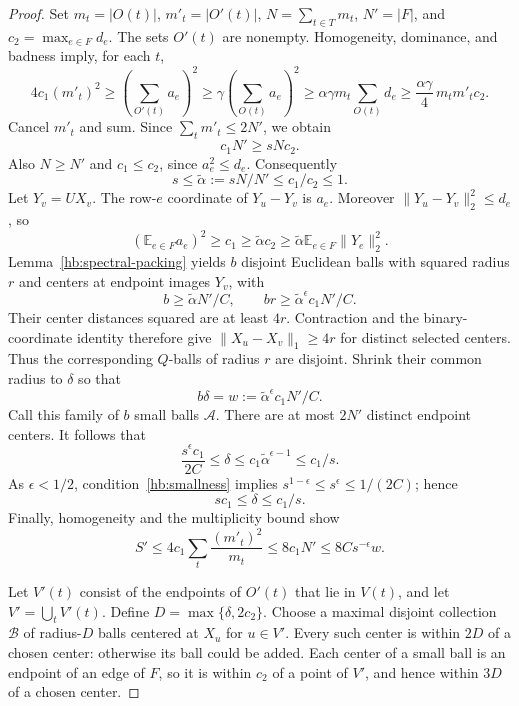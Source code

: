\documentclass[11pt]{amsart}
\theoremstyle{definition}
\theoremstyle{remark}
\numberwithin{equation}{section}
\begin{document}
\begin{proof}
Set $m_t=|O(t)|$, $m'_t=|O'(t)|$,
$N=\sum_{t\in T}m_t$, $N'=|F|$, and $c_2=\max_{e\in F}d_e$.
The sets $O'(t)$ are nonempty.  Homogeneity, dominance, and badness
imply, for each $t$,
\[
 4c_1(m'_t)^2
 \ge\left(\sum_{O'(t)}a_e\right)^2
 \ge\gamma\left(\sum_{O(t)}a_e\right)^2
 \ge\alpha\gamma m_t\sum_{O(t)}d_e
 \ge\frac{\alpha\gamma}{4}\,m_tm'_tc_2.
\]
Cancel $m'_t$ and sum.  Since
$\sum_t m'_t\le2N'$, we obtain
\begin{equation}\label{hb:density}
 c_1N'\ge sNc_2.
\end{equation}
Also $N\ge N'$ and $c_1\le c_2$, since $a_e^2\le d_e$.
Consequently
\[
 s\le\widetilde\alpha:=sN/N'\le c_1/c_2\le1.
\]
Let $Y_v=UX_v$.  The row-$e$ coordinate of $Y_u-Y_v$ is $a_e$.
Moreover $\|Y_u-Y_v\|_2^2\le d_e$, so
\[
 (\mathbb E_{e\in F}a_e)^2
 \ge c_1\ge\widetilde\alpha c_2
 \ge\widetilde\alpha\mathbb E_{e\in F}\|Y_e\|_2^2.
\]
Lemma~\ref{hb:spectral-packing} yields $b$ disjoint Euclidean balls
with squared radius $r$ and centers at endpoint images $Y_v$, with
\[
 b\ge\widetilde\alpha N'/C,
 \qquad br\ge\widetilde\alpha^\epsilon c_1N'/C.
\]
Their center distances squared are at least $4r$.  Contraction and
the binary-coordinate identity therefore give $\|X_u-X_v\|_1\ge4r$
for distinct selected centers.  Thus the corresponding $Q$-balls of
radius $r$ are disjoint.  Shrink their common radius to $\delta$ so that
\begin{equation}\label{hb:normalized-mass}
 b\delta=w:=\widetilde\alpha^\epsilon c_1N'/C.
\end{equation}
Call this family of $b$ small balls $\mathcal A$.
There are at most $2N'$ distinct endpoint centers.  It follows that
\[
 \frac{s^\epsilon c_1}{2C}\le\delta
 \le c_1\widetilde\alpha^{\epsilon-1}\le c_1/s.
\]
As $\epsilon<1/2$, condition~\eqref{hb:smallness} implies
$s^{1-\epsilon}\le s^\epsilon\le1/(2C)$; hence
\begin{equation}\label{hb:radius-range}
 sc_1\le\delta\le c_1/s.
\end{equation}
Finally, homogeneity and the multiplicity bound show
\begin{equation}\label{hb:numerator-mass}
 S'\le4c_1\sum_t\frac{(m'_t)^2}{m_t}
 \le8c_1N'\le8Cs^{-\epsilon}w.
\end{equation}

Let $V'(t)$ consist of the endpoints of $O'(t)$ that lie in $V(t)$,
and let $V'=\bigcup_tV'(t)$.  Define
$D=\max\{\delta,2c_2\}$.  Choose a maximal disjoint collection
$\mathcal B$ of radius-$D$ balls centered at $X_u$ for $u\in V'$.
Every such center is within $2D$ of a chosen center: otherwise its ball
could be added.  Each center of a small ball is an endpoint of an edge
of $F$, so it is within $c_2$ of a point of $V'$, and hence within $3D$
of a chosen center.


\end{proof}
\end{document}
